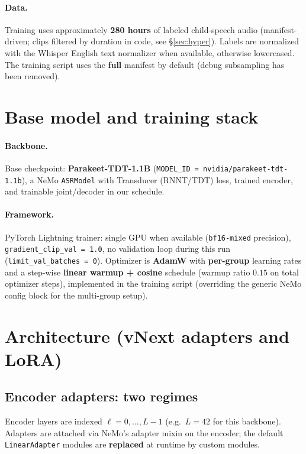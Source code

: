 \documentclass[11pt,a4paper]{article}
\begin{document}
\paragraph{Data.}
Training uses approximately \textbf{280 hours} of labeled child-speech audio (manifest-driven; clips filtered by duration in code, see \S\ref{sec:hyper}). Labels are normalized with the Whisper English text normalizer when available, otherwise lowercased. The training script uses the \textbf{full} manifest by default (debug subsampling has been removed).

\section{Base model and training stack}
\label{sec:base}

\paragraph{Backbone.}
Base checkpoint: \textbf{Parakeet-TDT-1.1B} (\texttt{MODEL\_ID = nvidia/parakeet-tdt-1.1b}), a NeMo \texttt{ASRModel} with Transducer (RNNT/TDT) loss, trained encoder, and trainable joint/decoder in our schedule.

\paragraph{Framework.}
PyTorch Lightning trainer: single GPU when available (\texttt{bf16-mixed} precision), \texttt{gradient\_clip\_val = 1.0}, no validation loop during this run (\texttt{limit\_val\_batches = 0}). Optimizer is \textbf{AdamW} with \textbf{per-group} learning rates and a step-wise \textbf{linear warmup + cosine} schedule (warmup ratio $0.15$ on total optimizer steps), implemented in the training script (overriding the generic NeMo config block for the multi-group setup).

\section{Architecture (vNext adapters and LoRA)}
\label{sec:arch}

\subsection{Encoder adapters: two regimes}
Encoder layers are indexed $\ell = 0,\ldots,L-1$ (e.g.\ $L=42$ for this backbone). Adapters are attached via NeMo's adapter mixin on the encoder; the default \texttt{LinearAdapter} modules are \textbf{replaced} at runtime by custom modules.
\end{document}
